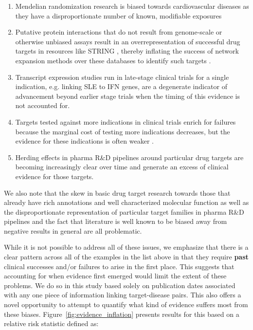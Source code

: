 \documentclass{article}
\begin{document}
\begin{enumerate}
\item Mendelian randomization research is biased towards cardiovascular diseases as they have a disproportionate number of known, modifiable exposures \cite{PMID:36736292}
\item Putative protein interactions that do not result from genome-scale or otherwise unbiased assays result in an overrepresentation of successful drug targets in resources like STRING \cite{PMID:36370105}, thereby inflating the success of network expansion methods over these databases to identify such targets \cite{Sadler2023-xd}.
\item Transcript expression studies run in late-stage clinical trials for a single indication, e.g. \cite{PMID:27723281} linking SLE to IFN genes, are a degenerate indicator of advancement beyond earlier stage trials when the timing of this evidence is not accounted for.
\item Targets tested against more indications in clinical trials enrich for failures because the marginal cost of testing more indications decreases, but the evidence for these indications is often weaker \cite{PMID:33262371}.
\item Herding effects in pharma R\&D pipelines around particular drug targets are becoming increasingly clear over time \cite{PMID:37117303} and generate an excess of clinical evidence for those targets.
\end{enumerate}

We also note that the skew in basic drug target research towards those that already have rich annotations and well characterized molecular function \cite{PMID:29358745} as well as the disproportionate representation of particular target families in pharma R\&D pipelines \cite{PMID:27910877,PPR:PPR7029} and the fact that literature is well known to be biased away from negative results in general \cite{PMID:32893970} are all problematic. 

While it is not possible to address all of these issues, we emphasize that there is a clear pattern across all of the examples in the list above in that they require \textbf{past} clinical successes and/or failures to arise in the first place. This suggests that accounting for when evidence first emerged would limit the extent of these problems. We do so in this study based solely on publication dates associated with any one piece of information linking target-disease pairs. This also offers a novel opportunity to attempt to quantify what kind of evidence suffers most from these biases. Figure~\ref{fig:evidence_inflation} presents results for this based on a relative risk statistic defined as:
\end{document}
